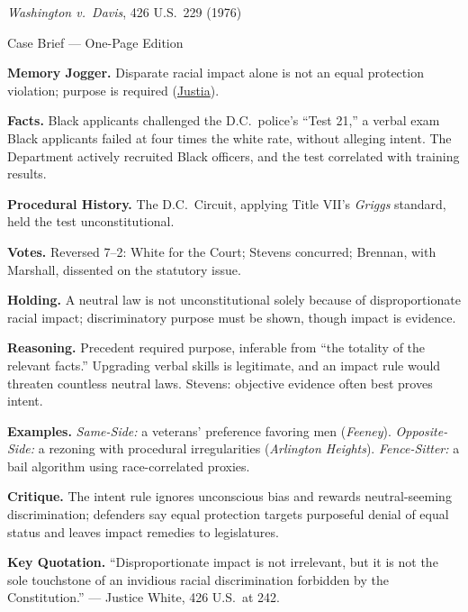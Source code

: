\documentclass[12pt]{article}
\begin{document}
\begin{center}
{\Large \textit{Washington v.\ Davis}, 426 U.S.\ 229 (1976)\par}
\vspace{0.3em}
{\normalsize Case Brief --- One-Page Edition\par}
\end{center}

\textbf{Memory Jogger.} Disparate racial impact alone is not an equal protection violation; purpose is required (\href{https://supreme.justia.com/cases/federal/us/426/229/}{Justia}).

\textbf{Facts.} Black applicants challenged the D.C.\ police's ``Test 21,'' a verbal exam Black applicants failed at four times the white rate, without alleging intent. The Department actively recruited Black officers, and the test correlated with training results.

\textbf{Procedural History.} The D.C.\ Circuit, applying Title VII's \textit{Griggs} standard, held the test unconstitutional.

\textbf{Votes.} Reversed 7--2: White for the Court; Stevens concurred; Brennan, with Marshall, dissented on the statutory issue.

\textbf{Holding.} A neutral law is not unconstitutional solely because of disproportionate racial impact; discriminatory purpose must be shown, though impact is evidence.

\textbf{Reasoning.} Precedent required purpose, inferable from ``the totality of the relevant facts.'' Upgrading verbal skills is legitimate, and an impact rule would threaten countless neutral laws. Stevens: objective evidence often best proves intent.

\textbf{Examples.} \emph{Same-Side:} a veterans' preference favoring men (\textit{Feeney}). \emph{Opposite-Side:} a rezoning with procedural irregularities (\textit{Arlington Heights}). \emph{Fence-Sitter:} a bail algorithm using race-correlated proxies.

\textbf{Critique.} The intent rule ignores unconscious bias and rewards neutral-seeming discrimination; defenders say equal protection targets purposeful denial of equal status and leaves impact remedies to legislatures.

\textbf{Key Quotation.} ``Disproportionate impact is not irrelevant, but it is not the sole touchstone of an invidious racial discrimination forbidden by the Constitution.'' --- Justice White, 426 U.S.\ at 242.
\end{document}
